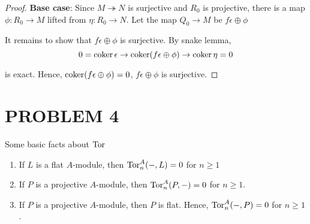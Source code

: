 \begin{proof}
	
	\textbf{Base case}: Since $M \twoheadrightarrow N$ is surjective and $R_0$ is projective, there is a map $\phi: R_0 \to M$ lifted from $\eta: R_0 \to N$. Let the map $Q_0 \to M$ be $f \epsilon \oplus \phi$
	
	
	\begin{center}
	\end{center}
	
	It remains to show that $f \epsilon \oplus \phi$ is surjective. By snake lemma, 
	$$
		0 = \operatorname{coker} \epsilon \to \operatorname{coker} (f \epsilon \oplus \phi) \to \operatorname{coker} \eta = 0
	$$

	is exact. Hence, $\operatorname{coker} (f \epsilon \oplus \phi) = 0$, $f \epsilon \oplus \phi$ is surjective.
	
\end{proof}

\section{PROBLEM 4}

\begin{lemma}
	\label{lemma4}
	Some basic facts about $\operatorname{Tor}$
	\begin{enumerate}
		\item If $L$ is a flat $A$-module, then $\operatorname{Tor}_n^A(-, L) = 0$ for $n \geq 1$
		\item If $P$ is a projective $A$-module, then $\operatorname{Tor}_n^A(P, -) = 0$ for $n \geq 1$.
		\item If $P$ is a projective $A$-module, then $P$ is flat. Hence, $\operatorname{Tor}_n^A(-, P) = 0$ for $n \geq 1$.
	\end{enumerate}
\end{lemma}

